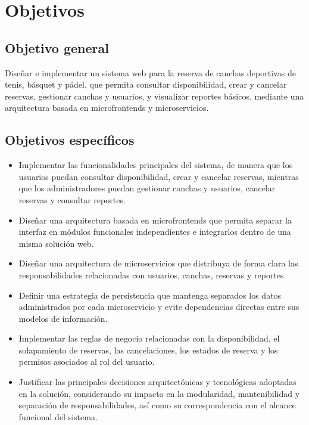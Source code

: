 
\section{Objetivos}
\label{sec:objetivos}

\subsection{Objetivo general}
\label{sec:objetivo-general}

Diseñar e implementar un sistema web para la reserva de canchas deportivas de tenis, básquet y pádel, que permita
consultar disponibilidad, crear y cancelar reservas, gestionar canchas y usuarios, y visualizar reportes básicos,
mediante una arquitectura basada en microfrontends y microservicios.

\subsection{Objetivos específicos}
\label{sec:objetivos-especificos}

\begin{itemize}

    \item Implementar las funcionalidades principales del sistema, de manera que los usuarios puedan consultar
    disponibilidad, crear y cancelar reservas, mientras que los administradores puedan gestionar canchas y
    usuarios, cancelar reservas y consultar reportes.

    \item Diseñar una arquitectura basada en microfrontends que permita separar la interfaz en módulos funcionales
    independientes e integrarlos dentro de una misma solución web.


    \item Diseñar una arquitectura de microservicios que distribuya de forma clara las responsabilidades relacionadas
    con usuarios, canchas, reservas y reportes.


    \item Definir una estrategia de persistencia que mantenga separados los datos administrados por cada microservicio
    y evite dependencias directas entre sus modelos de información.


    \item Implementar las reglas de negocio relacionadas con la disponibilidad, el solapamiento de reservas,
    las cancelaciones, los estados de reserva y los permisos asociados al rol del usuario.

    \item Justificar las principales decisiones arquitectónicas y tecnológicas adoptadas en la solución, considerando
    su impacto en la modularidad, mantenibilidad y separación de responsabilidades, así como su correspondencia
    con el alcance funcional del sistema.

\end{itemize}
